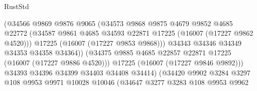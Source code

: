 \begin{lexlean}{RustStd}
\begin{coremodule}
                                      (@34566
                                        @9869
                                        @9876
                                        @9065
                                        (@34573
                                          @9868
                                          @9875
                                          @4679
                                          @9852
                                          @4685
                                          @22772
                                          (@34587
                                            @9861
                                            @4685
                                            @34593
                                            @22871
                                            @17225
                                            (@16007 (@17227 @9862 @4520)))
                                          @17225
                                          (@16007 (@17227 @9853 @9868)))
                                        @34343
                                        @34346
                                        @34349
                                        @34353
                                        @34358
                                        @34364))
                                    (@34375
                                      @9885
                                      @4685
                                      @22857
                                      @22871
                                      @17225
                                      (@16007 (@17227 @9886 @4520)))
                                    @17225
                                    (@16007 (@17227 @9846 @9892)))
                                  @34393
                                  @34396
                                  @34399
                                  @34403
                                  @34408
                                  @34414)
                                (@34420
                                  @9902
                                  @3284
                                  @3297
                                  @108
                                  @9953
                                  @9971
                                  @10028
                                  @10046
                                  (@34647
                                    @3277
                                    @3283
                                    @108
                                    @9953
                                    @9962

\end{coremodule}
\end{lexlean}

